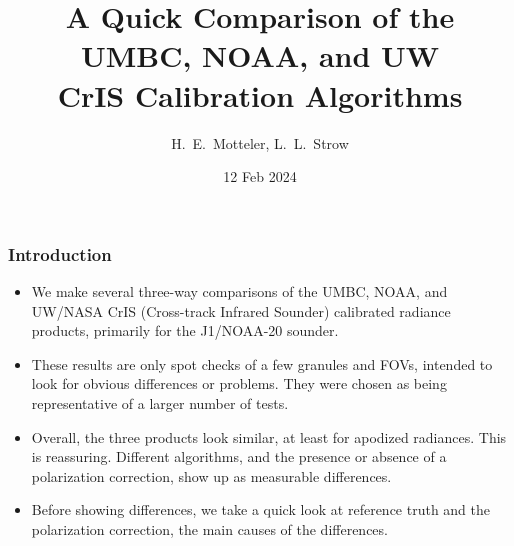 \documentclass[9pt]{beamer}
\title{A Quick Comparison of the UMBC, NOAA, and UW \\CrIS
       Calibration Algorithms}
\author{H.~E.~Motteler, L.~L.~Strow}
\institute{
  UMBC Atmospheric Spectroscopy Lab \\
  Joint Center for Earth Systems Technology \\
}
\date{12 Feb 2024}
\begin{document}
\begin{frame}[plain]
\titlepage
\end{frame}
\begin{frame}
\frametitle{Introduction}
\begin{itemize}

  \item We make several three-way comparisons of the UMBC, NOAA, and
    UW/NASA CrIS (Cross-track Infrared Sounder) calibrated radiance
    products, primarily for the J1/NOAA-20 sounder.

  \item These results are only spot checks of a few granules and
    FOVs, intended to look for obvious differences or problems.
    They were chosen as being representative of a larger number of
    tests.

  \item Overall, the three products look similar, at least for
    apodized radiances.  This is reassuring.  Different algorithms,
    and the presence or absence of a polarization correction, show
    up as measurable differences.

  \item Before showing differences, we take a quick look at
    reference truth and the polarization correction, the main
    causes of the differences.

\end{itemize}
\end{frame}
\end{document}
